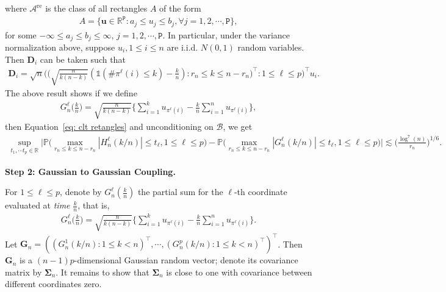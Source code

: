 \documentclass[10pt]{article}
\def\bu{\mathbf{u}}
\def\bD{\mathbf{D}}
\def\bG{\mathbf{G}}
\def\bSigma{\boldsymbol{\Sigma}}
\def\bD{\boldsymbol{D}}
\def\P{\mathbb{P}}
\def\reals{\mathbb{R}}
\def\ttp{\mathtt{P}}
\newcommand{\Indicator}{\mathds{1}}
\theoremstyle{definition}
\theoremstyle{remark}
\begin{document}
where $\mathcal{A}^\text{re}$ is the class of all rectangles $A$ of the form
\begin{align*}
    A = \{\bu \in \reals^{\ttp}: a_j \leq u_j \leq b_j, \forall j = 1, 2, \cdots, \ttp\},
\end{align*}
for some $- \infty \leq a_j \leq b_j \leq \infty$, $j = 1,2, \cdots, \ttp$. In particular, under the variance normalization above, suppose $u_i, 1 \leq i \leq n$ are i.i.d. $N(0,1)$ random variables. Then $\bD_i$ can be taken such that 
\begin{align*}
    \bD_i = \sqrt{n}\Big(\Big(\sqrt{\frac{n}{k(n-k)}} (\Indicator(\#\pi^{\ell}(i) \leq k) - \frac{k}{n}): r_n \leq k \leq n - r_n\Big)^\top: 1 \leq \ell \leq p\Big)^\top u_i.
\end{align*}
The above result shows if we define
\begin{align*}
    G_n^\ell\bigg(\frac{k}{n}\bigg) = \sqrt{\frac{n}{k(n-k)}} \bigg\{\sum_{i = 1}^k u_{\pi^\ell(i)} - \frac{k}{n} \sum_{i = 1}^n u_{\pi^\ell(i)} \bigg\}, 
\end{align*}
then Equation~\eqref{eq: clt retangles} and unconditioning on $\mathscr{B}$, we get
\begin{align*}
    \sup_{t_1, \cdots t_p \in \reals}\Big|\P\Big(\max_{r_n \leq k \leq n - r_n} |H_n^\ell(k/n)| \leq t_\ell, 1 \leq \ell \leq p\Big) - \P\Big(\max_{r_n \leq k \leq n - r_n} 
    |G_n^\ell(k/n)| \leq t_\ell, 1 \leq \ell \leq p\Big)\Big| 
    \lesssim  \bigg(\frac{\log^7(n)}{r_n}\bigg)^{1/6}.
\end{align*}

\begin{center}
    \textbf{Step 2: Gaussian to Gaussian Coupling.}
\end{center}
For $1 \leq \ell \leq p$, denote by $G_n^\ell(\frac{k}{n})$ the partial sum for the $\ell$-th coordinate evaluated at \textit{time} $\frac{k}{n}$, that is,
\begin{align*}
    G_n^\ell\bigg(\frac{k}{n}\bigg) = \sqrt{\frac{n}{k(n-k)}} \bigg\{\sum_{i = 1}^k u_{\pi^\ell(i)} - \frac{k}{n} \sum_{i = 1}^n u_{\pi^\ell(i)} \bigg\}.
\end{align*}
Let $\bG_n = ((G_n^1(k/n):1\leq k<n)^\top, \cdots, (G_n^p(k/n):1\leq k<n)^\top)^\top$. Then $\bG_n$ is a $(n-1)p$-dimensional Gaussian random vector; denote its covariance matrix by $\bSigma_n$. It remains to show that $\bSigma_n$ is close to one with covariance between different coordinates zero.
\end{document}
